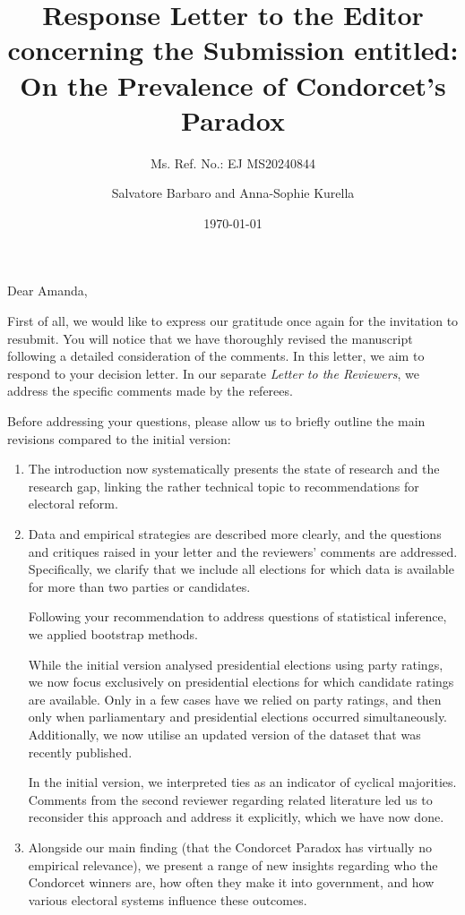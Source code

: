 \documentclass[a4paper, 12pt]{scrartcl}
\title{{\small Response Letter to the Editor concerning the Submission entitled:} \\ On the Prevalence of Condorcet's Paradox }
\subtitle{Ms. Ref. No.: EJ MS20240844}
\author{Salvatore Barbaro and Anna-Sophie Kurella}
\date{\today}
\begin{document}
\maketitle

\noindent Dear Amanda,

First of all, we would like to express our gratitude once again for the invitation to resubmit. You will notice that we have thoroughly revised the manuscript following a detailed consideration of the comments. In this letter, we aim to respond to your decision letter. In our separate \textit{Letter to the Reviewers}, we address the specific comments made by the referees.

Before addressing your questions, please allow us to briefly outline the main revisions compared to the initial version:
\begin{enumerate}
	\item The introduction now systematically presents the state of research and the research gap, linking the rather technical topic to recommendations for electoral reform.
	\item Data and empirical strategies are described more clearly, and the questions and critiques raised in your letter and the reviewers' comments are addressed. Specifically, we clarify that we include all elections for which data is available for more than two parties or candidates. 
	
	Following your recommendation to address questions of statistical inference, we applied bootstrap methods. 
	
	While the initial version analysed presidential elections using party ratings, we now focus exclusively on presidential elections for which candidate ratings are available. Only in a few cases have we relied on party ratings, and then only when parliamentary and presidential elections occurred simultaneously. Additionally, we now utilise an updated version of the dataset that was recently published. 
	
	In the initial version, we interpreted ties as an indicator of cyclical majorities. Comments from the second reviewer regarding related literature led us to reconsider this approach and address it explicitly, which we have now done.
	\item Alongside our main finding (that the Condorcet Paradox has virtually no empirical relevance), we present a range of new insights regarding who the Condorcet winners are, how often they make it into government, and how various electoral systems influence these outcomes.
\end{enumerate}
\end{document}
